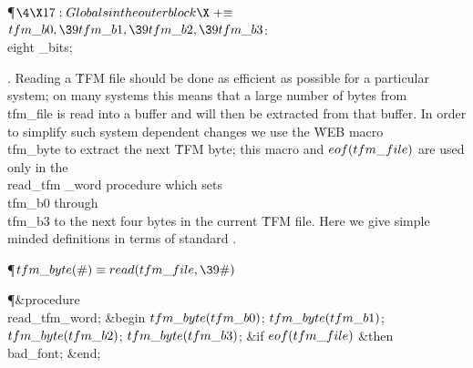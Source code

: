 \Y\P$\4\X17:Globals in the outer block\X\mathrel{+}\S$\6
\4$\\{tfm\_b0},\39\\{tfm\_b1},\39\\{tfm\_b2},\39\\{tfm\_b3}$: \\{eight%
\_bits};\par
\fi

. Reading a \.{TFM} file should be done as efficient as possible for a
particular system; on many systems this means that a large number of
bytes from \\{tfm\_file} is read into a buffer and will then be extracted
from that buffer. In order to simplify such system dependent changes
we use the \.{WEB} macro \\{tfm\_byte} to extract the next \.{TFM} byte;
this macro and $\\{eof}(\\{tfm\_file})$ are used only in the \\{read\_tfm%
\_word}
procedure which sets \\{tfm\_b0} through \\{tfm\_b3} to the next four bytes
in the current \.{TFM} file. Here we give simple minded definitions in
terms of standard \PASCAL.

\Y\P\D {}$\\{tfm\_byte}(\#)\S\\{read}(\\{tfm\_file},\39\#)$\par
\Y\P\4\&{procedure}\1\  \\{read\_tfm\_word};\2\6
\&{begin} $\\{tfm\_byte}(\\{tfm\_b0})$;\5
$\\{tfm\_byte}(\\{tfm\_b1})$;\5
$\\{tfm\_byte}(\\{tfm\_b2})$;\5
$\\{tfm\_byte}(\\{tfm\_b3})$;\6
\&{if} $\\{eof}(\\{tfm\_file})$ \1\&{then}\5
\\{bad\_font};\2\6
\&{end};\par
\fi

